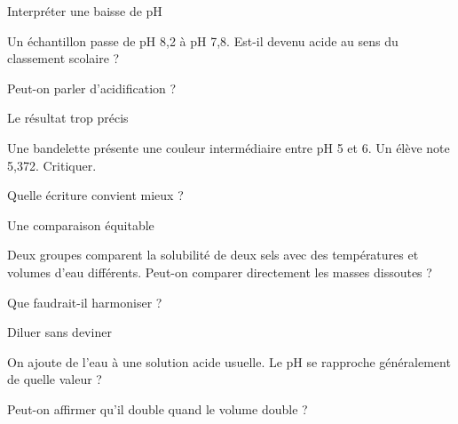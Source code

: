 \clearpage{}
\par\noindent\begin{minipage}{\linewidth}
\begin{exercice}[3]{Interpréter une baisse de pH}
\begin{questions}
\item Un échantillon passe de pH 8,2 à pH 7,8. Est-il devenu acide au sens du classement scolaire ?
\item Peut-on parler d’acidification ?
\end{questions}
\end{exercice}
\end{minipage}
\par\noindent\begin{minipage}{\linewidth}
\begin{exercice}[3]{Le résultat trop précis}
\begin{questions}
\item Une bandelette présente une couleur intermédiaire entre pH 5 et 6. Un élève note 5,372. Critiquer.
\item Quelle écriture convient mieux ?
\end{questions}
\end{exercice}
\end{minipage}
\par\noindent\begin{minipage}{\linewidth}
\begin{exercice}[3]{Une comparaison équitable}
\begin{questions}
\item Deux groupes comparent la solubilité de deux sels avec des températures et volumes d’eau différents. Peut-on comparer directement les masses dissoutes ?
\item Que faudrait-il harmoniser ?
\end{questions}
\end{exercice}
\end{minipage}
\par\noindent\begin{minipage}{\linewidth}
\begin{exercice}[3]{Diluer sans deviner}
\begin{questions}
\item On ajoute de l’eau à une solution acide usuelle. Le pH se rapproche généralement de quelle valeur ?
\item Peut-on affirmer qu’il double quand le volume double ?
\end{questions}
\end{exercice}
\end{minipage}
